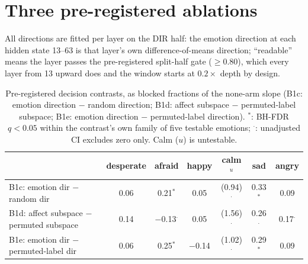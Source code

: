 \documentclass[11pt]{article}
\newcommand{\rid}[1]{{\footnotesize\texttt{#1}}}
\begin{document}
\section{Three pre-registered ablations}
\label{sec:ablations}
All directions are fitted per layer on the DIR half: the emotion direction at each hidden state 13--63 is that layer's own difference-of-means direction; ``readable'' means the layer passes the pre-registered split-half gate ($\ge 0.80$), which every layer from 13 upward does and the window starts at $0.2\times$ depth by design.

\begin{table}[t]\centering\footnotesize
\caption{Pre-registered decision contrasts, as blocked fractions of the none-arm slope (B1c: emotion direction $-$ random direction; B1d: affect subspace $-$ permuted-label subspace; B1e: emotion direction $-$ permuted-label direction). $^{*}$: BH-FDR $q<0.05$ within the contrast's own family of five testable emotions; $^{\cdot}$: unadjusted CI excludes zero only. Calm ($u$) is untestable.}
\label{tab:decision}
\begin{tabular}{lcccccc}\toprule
 & desperate & afraid & happy & calm$^{u}$ & sad & angry \\ \midrule
B1c: emotion dir $-$ random dir & 0.06 & 0.21$^{*}$ & 0.05 & (0.94)$^{\cdot}$ & 0.33$^{*}$ & 0.09 \\
B1d: affect subspace $-$ permuted subspace & 0.14 & $-$0.13$^{\cdot}$ & 0.05 & (1.56)$^{\cdot}$ & 0.26$^{\cdot}$ & 0.17$^{\cdot}$ \\
B1e: emotion dir $-$ permuted-label dir & 0.06 & 0.25$^{*}$ & $-$0.14 & (1.02)$^{\cdot}$ & 0.29$^{*}$ & 0.09 \\ \bottomrule
\end{tabular}
\end{table}

\begin{table}[t]\centering\footnotesize
\caption{Every hooked arm against baseline (none), as blocked fractions of the none-arm slope, scenario-blocked and dose-paired; marks as in Table~\ref{tab:decision}, families being the arm's five testable emotions (\rid{rev.b1c\_random\_vs\_none}, \rid{rev.b1c\_emo\_vs\_none\_fdr}, \rid{rev.b1d\_controls\_vs\_none}).}
\label{tab:arms}

\end{table}
\end{document}
